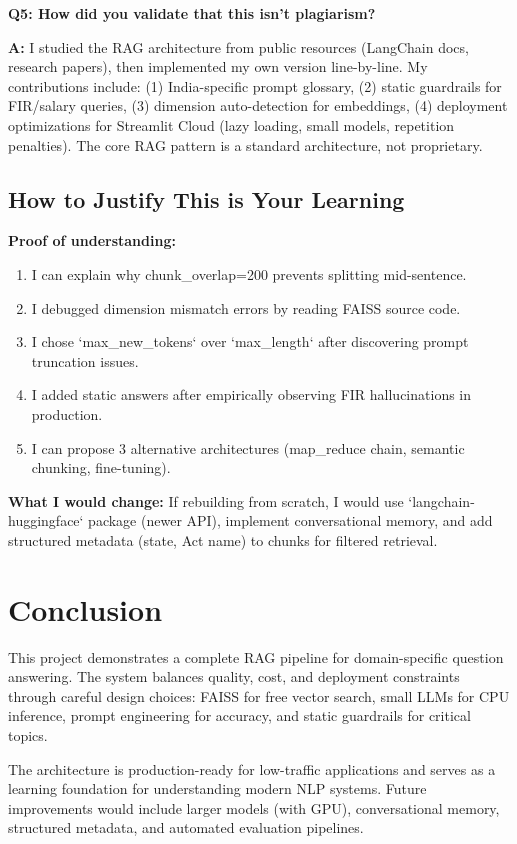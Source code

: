 \documentclass[11pt,a4paper]{article}
\begin{document}
\textbf{Q5: How did you validate that this isn't plagiarism?}

\textbf{A:} I studied the RAG architecture from public resources (LangChain docs, research papers), then implemented my own version line-by-line. My contributions include: (1) India-specific prompt glossary, (2) static guardrails for FIR/salary queries, (3) dimension auto-detection for embeddings, (4) deployment optimizations for Streamlit Cloud (lazy loading, small models, repetition penalties). The core RAG pattern is a standard architecture, not proprietary.

\subsection{How to Justify This is Your Learning}

\textbf{Proof of understanding:}
\begin{enumerate}
\item I can explain why chunk\_overlap=200 prevents splitting mid-sentence.
\item I debugged dimension mismatch errors by reading FAISS source code.
\item I chose `max\_new\_tokens` over `max\_length` after discovering prompt truncation issues.
\item I added static answers after empirically observing FIR hallucinations in production.
\item I can propose 3 alternative architectures (map\_reduce chain, semantic chunking, fine-tuning).
\end{enumerate}

\textbf{What I would change:} If rebuilding from scratch, I would use `langchain-huggingface` package (newer API), implement conversational memory, and add structured metadata (state, Act name) to chunks for filtered retrieval.

\section{Conclusion}

This project demonstrates a complete RAG pipeline for domain-specific question answering. The system balances quality, cost, and deployment constraints through careful design choices: FAISS for free vector search, small LLMs for CPU inference, prompt engineering for accuracy, and static guardrails for critical topics.

The architecture is production-ready for low-traffic applications and serves as a learning foundation for understanding modern NLP systems. Future improvements would include larger models (with GPU), conversational memory, structured metadata, and automated evaluation pipelines.
\end{document}
